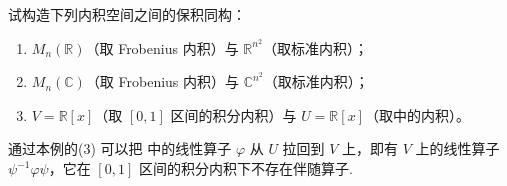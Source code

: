 \documentclass[../../main.tex]{subfiles}
\begin{document}
\begin{example}\label{example:例9.34}
试构造下列内积空间之间的保积同构：
\begin{enumerate}
\item \(M_n(\mathbb{R})\)（取 Frobenius 内积）与 \(\mathbb{R}^{n^2}\)（取标准内积）；
\item \(M_n(\mathbb{C})\)（取 Frobenius 内积）与 \(\mathbb{C}^{n^2}\)（取标准内积）；
\item \(V = \mathbb{R}[x]\)（取 \([0,1]\) 区间的积分内积）与 \(U = \mathbb{R}[x]\)（取中的内积）。
\end{enumerate}
\end{example}
\begin{remark}
通过本例的(3) 可以把 中的线性算子 \(\varphi\) 从 \(U\) 拉回到 \(V\) 上，即有 \(V\) 上的线性算子 \(\psi^{-1}\varphi\psi\)，它在 \([0,1]\) 区间的积分内积下不存在伴随算子. 
\end{remark}
\end{document}
